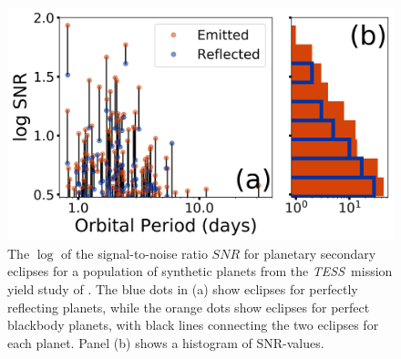 \documentclass[manuscript]{aastex62}
\newcommand{\tess}{{\it TESS}}
\begin{document}
\begin{figure}
\includegraphics[width=\textwidth]{eclipse_estimates.jpg}
\caption{The $\log$ of the signal-to-noise ratio $SNR$ for planetary secondary eclipses for a population of synthetic planets from the \tess\ mission yield study of \citet{2018arXiv180405050B}. The blue dots in (a)  show eclipses for perfectly reflecting planets, while the orange dots show eclipses for perfect blackbody planets, with black lines connecting the two eclipses for each planet. Panel (b) shows a histogram of SNR-values. \label{fig:eclipse_estimates}}

\end{figure}
\end{document}
